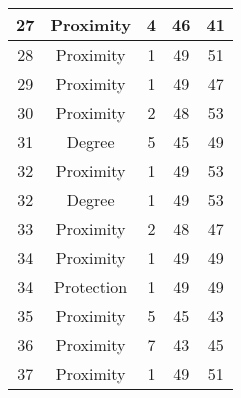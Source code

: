 \documentclass[results.tex]{subfiles}
\begin{document}
\begin{center}
\begin{tabular}{| c || c | c | c | c |}
            \hline
            27                      & Proximity                    & 4                      & 46                      & 41                   \\
            \hline
            28                      & Proximity                    & 1                      & 49                      & 51                   \\
            \hline
            29                      & Proximity                    & 1                      & 49                      & 47                   \\
            \hline
            30                      & Proximity                    & 2                      & 48                      & 53                   \\
            \hline
            31                      & Degree                       & 5                      & 45                      & 49                   \\
            \hline
            32                      & Proximity                    & 1                      & 49                      & 53                   \\
            \hline
            32                      & Degree                       & 1                      & 49                      & 53                   \\
            \hline
            33                      & Proximity                    & 2                      & 48                      & 47                   \\
            \hline
            34                      & Proximity                    & 1                      & 49                      & 49                   \\
            \hline
            34                      & Protection                   & 1                      & 49                      & 49                   \\
            \hline
            35                      & Proximity                    & 5                      & 45                      & 43                   \\
            \hline
            36                      & Proximity                    & 7                      & 43                      & 45                   \\
            \hline
            37                      & Proximity                    & 1                      & 49                      & 51                   \\

\end{tabular}
\end{center}
\end{document}
